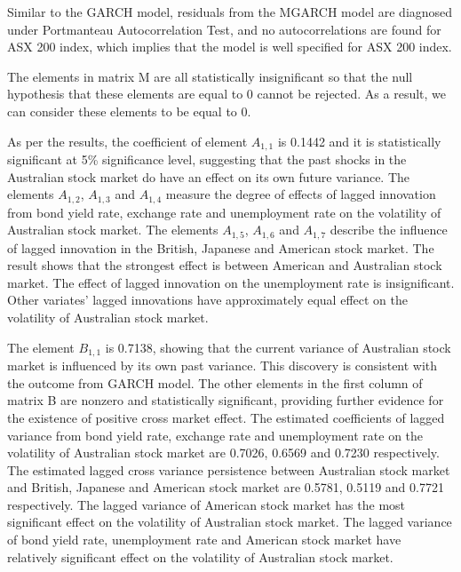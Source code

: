 \documentclass[11pt]{article}
\begin{document}
Similar to the GARCH model, residuals from the MGARCH model are diagnosed under Portmanteau Autocorrelation Test, and no autocorrelations are found for ASX 200 index, which implies that the model is well specified for ASX 200 index. 

The elements in matrix M are all statistically insignificant so that the null hypothesis that these elements are equal to 0 cannot be rejected. As a result, we can consider these elements to be equal to 0.

As per the results, the coefficient of element $A_{1,1}$ is 0.1442 and it is statistically significant at 5\% significance level, suggesting that the past shocks in the Australian stock market do have an effect on its own future variance. The elements $A_{1,2}$, $A_{1,3}$ and $A_{1,4}$ measure the degree of effects of lagged innovation from bond yield rate, exchange rate and unemployment rate on the volatility of Australian stock market. The elements $A_{1,5}$, $A_{1,6}$ and $A_{1,7}$ describe the influence of lagged innovation in the British, Japanese and American stock market. The result shows that the strongest effect is between American and Australian stock market. The effect of lagged innovation on the unemployment rate is insignificant. Other variates' lagged innovations have approximately equal effect on the volatility of Australian stock market.

The element  $B_{1,1}$ is 0.7138, showing that the current variance of Australian stock market is influenced by its own past variance. This discovery is consistent with the outcome from GARCH model. The other elements in the first column of matrix B are nonzero and statistically significant, providing further evidence for the existence of positive cross market effect. The estimated coefficients of lagged variance from bond yield rate, exchange rate and unemployment rate on the volatility of Australian stock market are 0.7026, 0.6569 and 0.7230 respectively. The estimated lagged cross variance persistence between Australian stock market and British, Japanese and American stock market are 0.5781, 0.5119 and 0.7721 respectively. The lagged variance of American stock market has the most significant effect on the volatility of Australian stock market. The lagged variance of bond yield rate, unemployment rate and American stock market have relatively significant effect on the volatility of Australian stock market.
\end{document}
